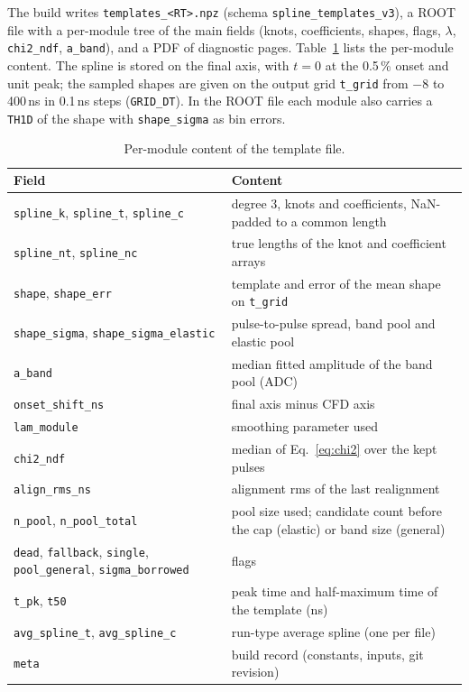 \documentclass[11pt]{article}
\newcommand{\code}[1]{\texttt{#1}}
\begin{document}
The build writes \code{templates\_<RT>.npz} (schema \code{spline\_templates\_v3}), a ROOT file with a per-module tree of the main fields (knots, coefficients, shapes, flags, $\lambda$, \code{chi2\_ndf}, \code{a\_band}), and a PDF of diagnostic pages. Table~\ref{tab:outputs} lists the per-module content. The spline is stored on the final axis, with $t = 0$ at the 0.5\,\% onset and unit peak; the sampled shapes are given on the output grid \code{t\_grid} from $-8$ to 400\,ns in 0.1\,ns steps (\code{GRID\_DT}). In the ROOT file each module also carries a \code{TH1D} of the shape with \code{shape\_sigma} as bin errors.

\begin{table}[htbp]
\centering
\caption{Per-module content of the template file.}
\label{tab:outputs}
\small
\begin{tabular}{p{}p{}}
\toprule
Field & Content \\
\midrule
\code{spline\_k}, \code{spline\_t}, \code{spline\_c} & degree 3, knots and coefficients, NaN-padded to a common length \\
\code{spline\_nt}, \code{spline\_nc} & true lengths of the knot and coefficient arrays \\
\code{shape}, \code{shape\_err} & template and error of the mean shape on \code{t\_grid} \\
\code{shape\_sigma}, \code{shape\_sigma\_elastic} & pulse-to-pulse spread, band pool and elastic pool \\
\code{a\_band} & median fitted amplitude of the band pool (ADC) \\
\code{onset\_shift\_ns} & final axis minus CFD axis \\
\code{lam\_module} & smoothing parameter used \\
\code{chi2\_ndf} & median of Eq.~\eqref{eq:chi2} over the kept pulses \\
\code{align\_rms\_ns} & alignment rms of the last realignment \\
\code{n\_pool}, \code{n\_pool\_total} & pool size used; candidate count before the cap (elastic) or band size (general) \\
\code{dead}, \code{fallback}, \code{single}, \code{pool\_general}, \code{sigma\_borrowed} & flags \\
\code{t\_pk}, \code{t50} & peak time and half-maximum time of the template (ns) \\
\code{avg\_spline\_t}, \code{avg\_spline\_c} & run-type average spline (one per file) \\
\code{meta} & build record (constants, inputs, git revision) \\
\bottomrule
\end{tabular}
\end{table}
\end{document}
